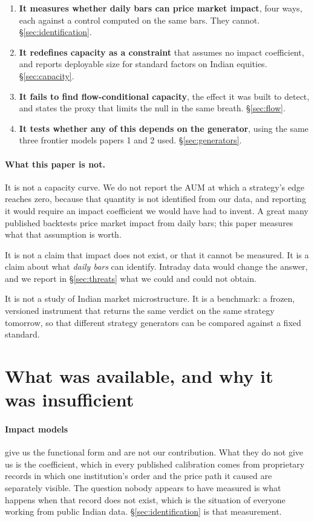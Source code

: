 \documentclass[11pt,a4paper]{article}
\begin{document}
\begin{enumerate}
\item \textbf{It measures whether daily bars can price market impact}, four ways, each against a
  control computed on the same bars. They cannot. \S\ref{sec:identification}.
\item \textbf{It redefines capacity as a constraint} that assumes no impact coefficient, and
  reports deployable size for standard factors on Indian equities. \S\ref{sec:capacity}.
\item \textbf{It fails to find flow-conditional capacity}, the effect it was built to detect, and
  states the proxy that limits the null in the same breath. \S\ref{sec:flow}.
\item \textbf{It tests whether any of this depends on the generator}, using the same three
  frontier models papers 1 and 2 used. \S\ref{sec:generators}.
\end{enumerate}

\paragraph{What this paper is not.} It is not a capacity curve. We do not report the AUM at which a
strategy's edge reaches zero, because that quantity is not identified from our data, and reporting
it would require an impact coefficient we would have had to invent. A great many published
backtests price market impact from daily bars; this paper measures what that assumption is worth.

It is not a claim that impact does not exist, or that it cannot be measured. It is a claim about
what \emph{daily bars} can identify. Intraday data would change the answer, and we report in
\S\ref{sec:threats} what we could and could not obtain.

It is not a study of Indian market microstructure. It is a benchmark: a frozen, versioned instrument
that returns the same verdict on the same strategy tomorrow, so that different strategy generators
can be compared against a fixed standard.

\section{What was available, and why it was insufficient}
\label{sec:related}

\paragraph{Impact models} \citep{almgren2005} give us the functional form and are not our
contribution. What they do not give us is the coefficient, which in every published calibration
comes from proprietary records in which one institution's order and the price path it caused are
separately visible. The question nobody appears to have measured is what happens when that record
does not exist, which is the situation of everyone working from public Indian data.
\S\ref{sec:identification} is that measurement.
\end{document}
